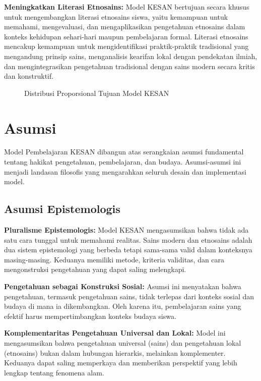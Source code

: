 \documentclass[12pt,a4paper,oneside]{book}
\begin{document}
\textbf{Meningkatkan Literasi Etnosains:} Model KESAN bertujuan secara khusus untuk mengembangkan literasi etnosains siswa, yaitu kemampuan untuk memahami, mengevaluasi, dan mengaplikasikan pengetahuan etnosains dalam konteks kehidupan sehari-hari maupun pembelajaran formal. Literasi etnosains mencakup kemampuan untuk mengidentifikasi praktik-praktik tradisional yang mengandung prinsip sains, menganalisis kearifan lokal dengan pendekatan ilmiah, dan mengintegrasikan pengetahuan tradisional dengan sains modern secara kritis dan konstruktif.

\begin{figure}[H]
  \centering
  \caption{Distribusi Proporsional Tujuan Model KESAN}
  \label{fig:tujuan_proporsi}
\end{figure}

\section{Asumsi}

Model Pembelajaran KESAN dibangun atas serangkaian asumsi fundamental tentang hakikat pengetahuan, pembelajaran, dan budaya. Asumsi-asumsi ini menjadi landasan filosofis yang mengarahkan seluruh desain dan implementasi model.

\subsection{Asumsi Epistemologis}

\textbf{Pluralisme Epistemologis:} Model KESAN mengasumsikan bahwa tidak ada satu cara tunggal untuk memahami realitas. Sains modern dan etnosains adalah dua sistem epistemologi yang berbeda tetapi sama-sama valid dalam konteksnya masing-masing. Keduanya memiliki metode, kriteria validitas, dan cara mengonstruksi pengetahuan yang dapat saling melengkapi.

\textbf{Pengetahuan sebagai Konstruksi Sosial:} Asumsi ini menyatakan bahwa pengetahuan, termasuk pengetahuan sains, tidak terlepas dari konteks sosial dan budaya di mana ia dikembangkan. Oleh karena itu, pembelajaran sains yang efektif harus mempertimbangkan konteks budaya siswa.

\textbf{Komplementaritas Pengetahuan Universal dan Lokal:} Model ini mengasumsikan bahwa pengetahuan universal (sains) dan pengetahuan lokal (etnosains) bukan dalam hubungan hierarkis, melainkan komplementer. Keduanya dapat saling memperkaya dan memberikan perspektif yang lebih lengkap tentang fenomena alam.
\end{document}
